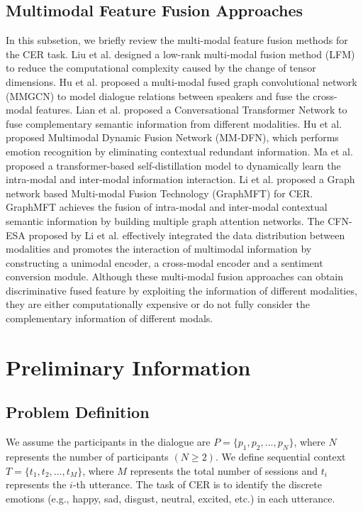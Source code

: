{{\subsection{Multimodal Feature Fusion Approaches}
In this subsetion, we briefly review the multi-modal feature fusion methods for the CER task. Liu et al. \cite{Liu2018EfficientLM} designed a low-rank multi-modal fusion method (LFM) to reduce the computational complexity caused by the change of tensor dimensions. Hu et al. \cite{hu2021mmgcn} proposed a multi-modal fused graph convolutional network (MMGCN) to model dialogue relations between speakers and fuse the cross-modal features. Lian et al. \cite{lian2021ctnet} proposed a Conversational Transformer Network to fuse complementary semantic information from different modalities. Hu et al. \cite{hu2022mm} proposed Multimodal Dynamic Fusion Network (MM-DFN), which performs emotion recognition by eliminating contextual redundant information. {Ma et al. \cite{10109845} proposed a transformer-based self-distillation model to dynamically learn the intra-modal and inter-modal information interaction.} {Li et al. \cite{li2023graphmft} proposed a Graph network based Multi-modal Fusion Technology (GraphMFT) for CER. GraphMFT achieves the fusion of intra-modal and inter-modal contextual semantic information by building multiple graph attention networks.} {The CFN-ESA proposed by Li et al. \cite{li2024cfn} effectively integrated the data distribution between modalities and promotes the interaction of multimodal information by constructing a unimodal encoder, a cross-modal encoder and a sentiment conversion module.} Although these multi-modal fusion approaches can obtain discriminative fused feature by exploiting the information of different modalities, they are either computationally expensive or do not fully consider the complementary information of different modals.

\section{Preliminary Information}

\subsection{Problem Definition}
We assume the participants in the dialogue are $P=\{p_1,p_2,\ldots,p_N \}$, where $N$ represents the number of participants $(N\geq2)$. We define sequential context $T=\{t_1,t_2,\ldots,t_M \}$, where $M$ represents the total number of sessions and $t_i$ represents the $i$-th utterance. The task of CER is to identify the discrete emotions (e.g., happy, sad, disgust, neutral, excited, etc.) in each utterance.

}}
